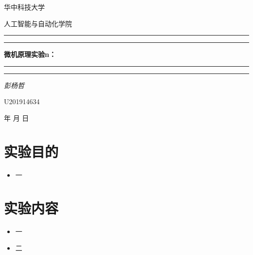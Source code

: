 \documentclass[onecolumn,a4paper]{article}
\begin{document}
\renewcommand{\today}{\number\year 年 \number\month 月 \number\day 日}

\begin{titlepage}			%
	\centering
	{\scshape\LARGE 华中科技大学\par}
	{\scshape \LARGE 人工智能与自动化学院\par}
	\vspace{1cm}
	\hrule height 2pt \vspace{1mm}\hrule height 1pt \vspace{0.4cm}
  {\huge\bfseries 微机原理实验n：\par}
  \vspace{0.4cm}\hrule height 1pt \vspace{1mm}\hrule height 2pt
	\vspace{1cm}
	{\Large\itshape 彭杨哲\par}		%
	\vspace{1cm}
	{\large U201914634 \hfill\par}		%
	\vspace{1cm}
	{\large \today\par}
\end{titlepage}

\newpage

\section{实验目的}
\begin{itemize}
    \item 一
\end{itemize}

\section{实验内容}
\begin{itemize}
    \item 一
    \item 二
\end{itemize}
\end{document}
